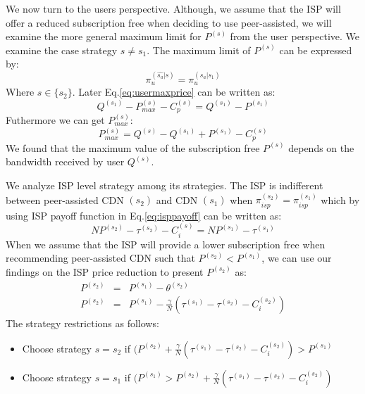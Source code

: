 \documentclass[paper]{ieice}
\begin{document}
We now turn to the users perspective.  
Although, we assume that the ISP will offer a reduced subscription free when deciding to use peer-assisted, we will examine the more general maximum limit for $P^{(s)}$ from the user perspective.
We examine the case strategy $s \neq s_1$.
The maximum limit of $P^{(s)}$ can be expressed by:
\begin{equation}\label{eq:usermaxprice}
	\pi^{(\hat{s_a}|s)}_u = \pi^{(s_a|s_1)}_u
\end{equation}
Where $s \in \{s_2\}$. Later Eq.\ref{eq:usermaxprice} can be written as:
\begin{equation}
	Q^{(s_1)} - P^{(s)}_{max} - C^{(s)}_{p} = Q^{(s_1)} - P^{(s_1)}
\end{equation}
Futhermore we can get $P^{(s)}_{max}$:  
\begin{equation}\label{eq:usermaxprice2}
	P^{(s)}_{max} = Q^{(s)} - Q^{(s_1)} + P^{(s_1)} - C^{(s)}_{p}
\end{equation}
We found that the maximum value of the subscription free $P^{(s)}$ depends on the bandwidth received by user $Q^{(s)}$.


We analyze ISP level strategy among its strategies.
The ISP is indifferent between peer-assisted CDN $(s_2)$ and CDN $(s_1)$ when $\pi^{(s_2)}_{isp} = \pi^{(s_1)}_{isp}$
which by using ISP payoff function in Eq.\ref{eq:isppayoff} can be written as: 
\begin{equation}
	N P^{(s_2)} - \tau^{(s_2)} - C^{(s)}_{i} = N P^{(s_1)} - \tau^{(s_1)}
\end{equation}
When we assume that the ISP will provide a lower subscription free when recommending peer-assisted CDN such that $P^{(s_2)} < P^{(s_1)}$, we can use our findings on the ISP price reduction to present $P^{(s_2)}$ as:
\begin{eqnarray}
	\nonumber P^{(s_2)} &=& P^{(s_1)} - \theta^{(s_2)} \\
	P^{(s_2)} &=& P^{(s_1)} - \frac{\gamma}{N} (\tau^{(s_1)} - \tau^{(s_2)} - C^{(s_2)}_i )
\end{eqnarray}
The strategy restrictions as follows:
\begin{itemize}
	\item Choose strategy $s=s_2$ if $ (P^{(s_2)} + \frac{\gamma}{N} (\tau^{(s_1)} - \tau^{(s_2)} - C^{(s_2)}_i ) > P^{(s_1)}$
	\item Choose strategy $s=s_1$ if $ (P^{(s_1)} > P^{(s_2)} + \frac{\gamma}{N} (\tau^{(s_1)} - \tau^{(s_2)} - C^{(s_2)}_i )$ 
\end{itemize}
\end{document}
